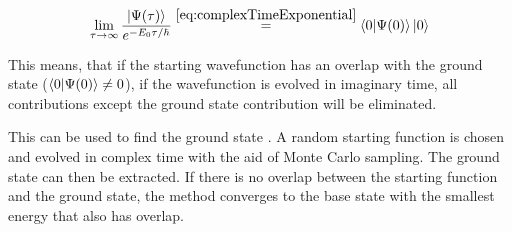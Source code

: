 \begin{equation}
    \label{eq:complexTimeApplication}
    \lim\limits_{\tau \rightarrow \infty}\frac{\ket{\Psi(\tau)}}{e^{-E_0 \tau / \hbar}} \stackrel{\ref{eq:complexTimeExponential}}{=} \bra{0}\ket{\Psi(0)} \ket{0}
\end{equation}

This means, that if the starting wavefunction has an overlap with the ground state ($\bra{0}\ket{\Psi(0)} \neq 0$), if the wavefunction is evolved in imaginary time, all contributions except the ground state contribution will be eliminated.

This can be used to find the ground state \cite{quantumMonteCarloSimulationsOfSolids}. A random starting function is chosen and evolved in complex time with the aid of Monte Carlo sampling. The ground state can then be extracted. If there is no overlap between the starting function and the ground state, the method converges to the base state with the smallest energy that also has overlap.